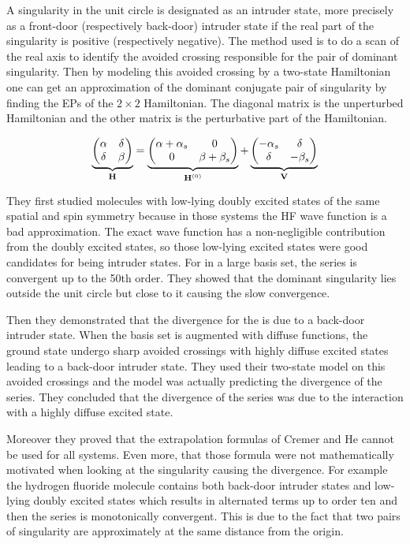 \documentclass[11pt,a4paper]{article}
\newcommand{\bH}{\mathbf{H}}
\newcommand{\bV}{\mathbf{V}}
\begin{document}
A singularity in the unit circle is designated as an intruder state, more precisely as a front-door (respectively back-door) intruder state if the real part of the singularity is positive (respectively negative). The method used is to do a scan of the real axis to identify the avoided crossing responsible for the pair of dominant singularity. Then by modeling this avoided crossing by a two-state Hamiltonian one can get an approximation of the dominant conjugate pair of singularity by finding the EPs of the $2\times2$ Hamiltonian. The diagonal matrix is the unperturbed Hamiltonian and the other matrix is the perturbative part of the Hamiltonian.

\begin{equation}
\underbrace{\mqty(\alpha & \delta \\ \delta & \beta)}_{\bH} = \underbrace{\mqty(\alpha + \alpha_s & 0 \\ 0 & \beta + \beta_s )}_{\bH^{(0)}} + \underbrace{\mqty(- \alpha_s & \delta \\ \delta & - \beta_s)}_{\bV}
\end{equation}
 
They first studied molecules with low-lying doubly excited states of the same spatial and spin symmetry because in those systems the HF wave function is a bad approximation. The exact wave function has a non-negligible contribution from the doubly excited states, so those low-lying excited states were good candidates for being intruder states. For  in a large basis set, the series is convergent up to the 50th order. They showed that the dominant singularity lies outside the unit circle but close to it causing the slow convergence.

Then they demonstrated that the divergence for the  is due to a back-door intruder state. When the basis set is augmented with diffuse functions, the ground state undergo sharp avoided crossings with highly diffuse excited states leading to a back-door intruder state. They used their two-state model on this avoided crossings and the model was actually predicting the divergence of the series. They concluded that the divergence of the series was due to the interaction with a highly diffuse excited state. 

Moreover they proved that the extrapolation formulas of Cremer and He \cite{Cremer_1996} cannot be used for all systems. Even more, that those formula were not mathematically motivated when looking at the singularity causing the divergence. For example the hydrogen fluoride molecule contains both back-door intruder states and low-lying doubly excited states which results in alternated terms up to order ten and then the series is monotonically convergent. This is due to the fact that two pairs of singularity are approximately at the same distance from the origin.
\end{document}
